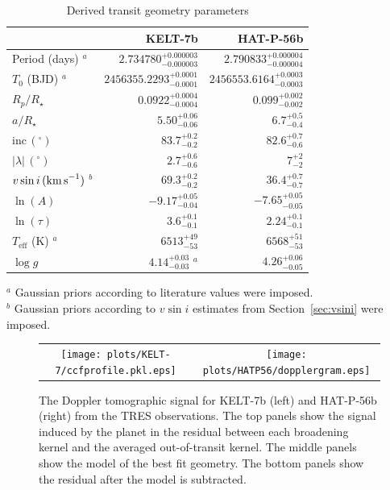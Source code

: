 \documentclass[useAMS,usenatbib]{mn2e}
\begin{document}
\begin{table}
  
  \caption{\label{tab:parameters}Derived transit geometry parameters}
  \begin{tabular}{lrr}
    \hline\hline
    & \textbf{KELT-7b} & \textbf{HAT-P-56b}\\
    \hline
    Period (days) $^a$ & $2.734780_{-0.000003}^{+0.000003}$& $2.790833_{-0.000004}^{+0.000004}$ \\
    $T_0$ (BJD)  $^a$  & $2456355.2293_{-0.0001}^{+0.0001}$ & $2456553.6164_{-0.0003}^{+0.0003}$ \\
    $R_p/R_\star$  & $0.0922_{-0.0004}^{+0.0004}$ & $0.099_{-0.002}^{+0.002}$ \\
    $a/R_\star$  & $5.50_{-0.06}^{+0.06}$ &  $6.7_{-0.4}^{+0.5}$ \\
    $\text{inc}\,(^\circ)$  & $83.7_{-0.2}^{+0.2}$ & $82.6_{-0.6}^{+0.7}$\\
    $|\lambda|\,(^\circ)$  & $2.7_{-0.6}^{+0.6}$ & $7_{-2}^{+2}$\\
    $v\sin i\,(\text{km\,s}^{-1})$  $^b$  & $69.3_{-0.2}^{+0.2}$ & $36.4_{-0.7}^{+0.7}$\\
    $\ln(A)$  & $-9.17_{-0.04}^{+0.05}$ & $-7.65_{-0.05}^{+0.05}$ \\
    $\ln(\tau)$  & $3.6_{-0.1}^{+0.1}$ & $2.24_{-0.1}^{+0.1}$\\
    $T_\mathrm{eff}$ (K) $^a$  & $6513_{-53}^{+49}$& $6568_{-53}^{+51}$\\
    $\log g$  & $4.14_{-0.03}^{+0.03}$ $^a$ & $4.26_{-0.05}^{+0.06}$\\
    \hline
  \end{tabular}
  \begin{flushleft}
  $^a$ Gaussian priors according to literature values were imposed.\\
  $^b$ Gaussian priors according to $v\sin i$ estimates from Section~\ref{sec:vsini} were imposed.  
  \end{flushleft}
\end{table}

\begin{figure}
  \begin{tabular}{cc}
    \texttt{[image: plots/KELT-7/ccfprofile.pkl.eps]} &
    \texttt{[image: plots/HATP56/dopplergram.eps]} \\
  \end{tabular}
  
  \caption{\label{fig:dopplergram}The Doppler tomographic signal for KELT-7b (left) and HAT-P-56b (right) from the TRES observations. The top panels show the signal induced by the planet in the residual between each broadening kernel and the averaged out-of-transit kernel. The middle panels show the model of the best fit geometry. The bottom panels show the residual after the model is subtracted. }
\end{figure}
\end{document}

